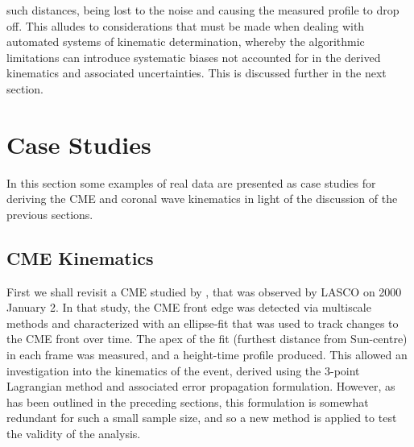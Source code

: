 \documentclass[structabstract]{aa}
\begin{document}
such distances, being lost to the noise and causing the measured profile to drop off. This alludes to considerations that must be made when dealing with automated systems of kinematic determination, whereby the algorithmic limitations can introduce systematic biases not accounted for in the derived kinematics and associated uncertainties. This is discussed further in the next section.




\section{Case Studies}
\label{sect:case_studies}

In this section some examples of real data are presented as case studies for deriving the CME and coronal wave kinematics in light of the discussion of the previous sections. %

\subsection{CME Kinematics}
\label{subsect:corimp}


First we shall revisit a CME studied by \citet{2009A&A...495..325B}, that was observed by LASCO on 2000 January 2. In that study, the CME front edge was detected via multiscale methods and characterized with an ellipse-fit that was used to track changes to the CME front over time. The apex of the fit (furthest distance from Sun-centre) in each frame was measured, and a height-time profile produced. This allowed an investigation into the kinematics of the event, derived using the 3-point Lagrangian method and associated error propagation formulation. However, as has been outlined in the preceding sections, this formulation is somewhat redundant for such a small sample size, and so a new method is applied to test the validity of the analysis.
\end{document}
